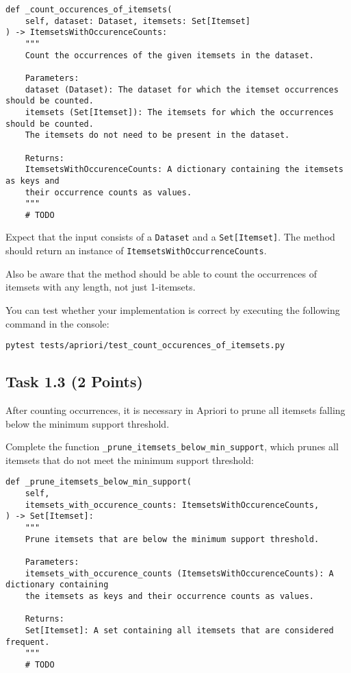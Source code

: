 \documentclass[
english,
smallborders
]{i6prcsht}
\newcommand{\points}[1]{\hfill \color{red}(#1 Points)\color{black}}
\begin{document}
\vspace*{0.3cm}

\begin{lstlisting}
def _count_occurences_of_itemsets(
	self, dataset: Dataset, itemsets: Set[Itemset]
) -> ItemsetsWithOccurenceCounts:
	"""
    Count the occurrences of the given itemsets in the dataset.

	Parameters:
	dataset (Dataset): The dataset for which the itemset occurrences should be counted.
	itemsets (Set[Itemset]): The itemsets for which the occurrences should be counted.
	The itemsets do not need to be present in the dataset.

	Returns:
	ItemsetsWithOccurenceCounts: A dictionary containing the itemsets as keys and
	their occurrence counts as values.
	"""
	# TODO
\end{lstlisting}

\vspace*{0.1cm}

Expect that the input consists of a \texttt{Dataset} and a \texttt{Set[Itemset]}. The method should return an instance of \texttt{ItemsetsWithOccurrenceCounts}.

Also be aware that the method should be able to count the occurrences of itemsets with any length, not just 1-itemsets.

You can test whether your implementation is correct by executing the following command in the console:

\vspace*{0.3cm}

\begin{lstlisting}
pytest tests/apriori/test_count_occurences_of_itemsets.py
\end{lstlisting}

\vspace*{0.1cm}

\subsection*{Task 1.3 \points{2}}

After counting occurrences, it is necessary in Apriori to prune all itemsets falling below the minimum support threshold.

Complete the function \texttt{\_prune\_itemsets\_below\_min\_support}, which prunes all itemsets that do not meet the minimum support threshold:

\vspace*{0.3cm}

\begin{lstlisting}
def _prune_itemsets_below_min_support(
	self,
	itemsets_with_occurence_counts: ItemsetsWithOccurenceCounts,
) -> Set[Itemset]:
	"""
	Prune itemsets that are below the minimum support threshold.

	Parameters:
	itemsets_with_occurence_counts (ItemsetsWithOccurenceCounts): A dictionary containing
	the itemsets as keys and their occurrence counts as values.

	Returns:
	Set[Itemset]: A set containing all itemsets that are considered frequent.
	"""
 	# TODO
\end{lstlisting}
\end{document}
